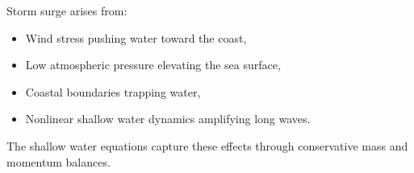 \documentclass[11pt]{article}
\begin{document}
Storm surge arises from:

\begin{itemize}
    \item Wind stress pushing water toward the coast,
    \item Low atmospheric pressure elevating the sea surface,
    \item Coastal boundaries trapping water,
    \item Nonlinear shallow water dynamics amplifying long waves.
\end{itemize}

The shallow water equations capture these effects through conservative mass and momentum balances.
\end{document}
